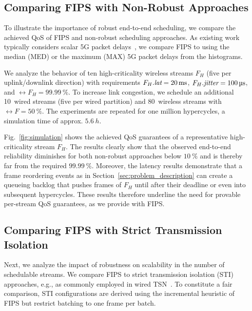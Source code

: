 \subsection{Comparing FIPS with Non-Robust Approaches} \label{sec:eval:non-robust}
To illustrate the importance of robust end-to-end scheduling, we compare the achieved QoS of FIPS and non-robust scheduling approaches.
As existing work typically considers scalar 5G packet delays~\cite{9212049,9940254}, we compare FIPS to using the median (MED) or the maximum (MAX) 5G packet delays from the histograms.



We analyze the behavior of ten high-criticality wireless streams $F_H$ (five per uplink/downlink direction) with requirements $\ete{F_H} = \qty{20}{\ms}$, $\jitter{F_H} = \qty{100}{\us}$, and $\rel{F_H} = \qty{99.99}{\percent}$.
To increase link congestion, we schedule an additional 10~wired streams (five per wired partition) and 80~wireless streams with $\rel{F} = \qty{50}{\percent}$.
The experiments are repeated for one million hypercycles, a simulation time of approx. $\qty{5.6}{h}$.

Fig.~\ref{fig:simulation} shows the achieved QoS guarantees of a representative high-criticality stream $F_H$.
The results clearly show that the observed end-to-end reliability diminishes for both non-robust approaches below $\qty{10}{\percent}$ and is thereby far from the required $\qty{99.99}{\percent}$.
Moreover, the latency results demonstrate that a frame reordering events as in Section~\ref{sec:problem_description} can create a queueing backlog that pushes frames of $F_H$ until after their deadline or even into subsequent hypercycles.
These results therefore underline the need for provable per-stream QoS guarantees, as we provide with FIPS.



\subsection{Comparing FIPS with Strict Transmission Isolation} \label{sec:eval:sti}
Next, we analyze the impact of robustness on scalability in the number of schedulable streams.
We compare FIPS to strict transmission isolation (STI) approaches, e.g., as commonly employed in wired TSN~\cite{nwps,Craciunas2016RTNS}.
To constitute a fair comparison, STI configurations are derived using the incremental heuristic of FIPS but restrict batching to one frame per batch.

